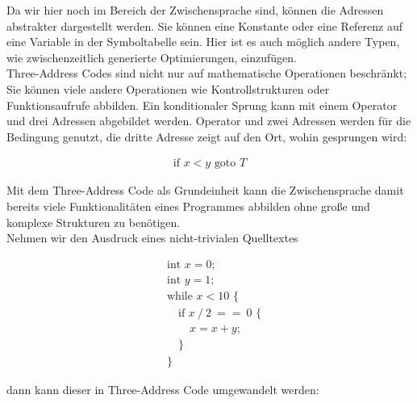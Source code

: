 Da wir hier noch im Bereich der Zwischensprache sind, können die Adressen abstrakter dargestellt werden.
Sie können eine Konstante oder eine Referenz auf eine Variable in der Symboltabelle sein.
Hier ist es auch möglich andere Typen, wie zwischenzeitlich generierte Optimierungen, einzufügen\cite{aho:2006}.\\

Three-Address Codes sind nicht nur auf mathematische Operationen beschränkt;
Sie können viele andere Operationen wie Kontrollstrukturen oder Funktionsaufrufe abbilden.
Ein konditionaler Sprung kann mit einem Operator und drei Adressen abgebildet werden.
Operator und zwei Adressen werden für die Bedingung genutzt, die dritte Adresse zeigt auf den Ort, wohin gesprungen wird:

\begin{figure}[H]
  \begin{align*}
    \text{if } x < y \text{ goto } T
  \end{align*}
\end{figure}

Mit dem Three-Address Code als Grundeinheit kann die Zwischensprache damit bereits viele Funktionalitäten eines Programmes abbilden ohne große und komplexe Strukturen zu benötigen.\\
Nehmen wir den Ausdruck eines nicht-trivialen Quelltextes

\begin{figure}[H]
  \begin{align*}
    &\text{int } x = 0;\\
    &\text{int } y = 1;\\
    &\text{while } x < 10 \text{ \{}\\
    &\quad\text{if } x\ /\ 2\ ==\ 0 \text{ \{}\\
    &\quad\quad x = x + y;\\
    &\quad\text{\}}\\
    &\text{\}}
  \end{align*}
\end{figure}

dann kann dieser in Three-Address Code umgewandelt werden:



